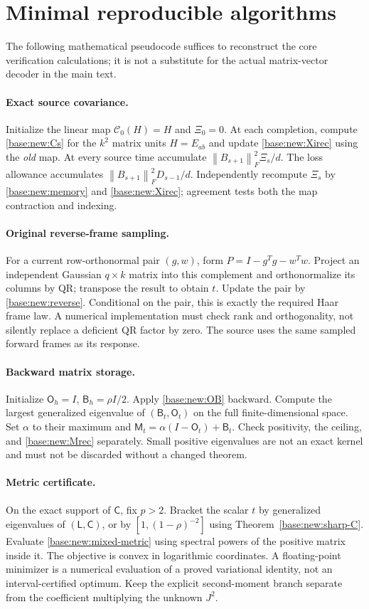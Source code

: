 \documentclass[11pt,oneside,openany,a4paper]{book}
\numberwithin{equation}{chapter}
\theoremstyle{definition}
\theoremstyle{remark}
\newcommand{\F}[1]{\left\lVert#1\right\rVert_F}
\newcommand{\Cov}{\mathsf C}\newcommand{\Loss}{\mathsf L}\newcommand{\Fil}{\mathcal F}
\begin{document}
\section{Minimal reproducible algorithms}\label{base:new:algorithms}
The following mathematical pseudocode suffices to reconstruct the core verification calculations; it is not a substitute for the actual matrix-vector decoder in the main text.

\paragraph{Exact source covariance.}
Initialize the linear map $\mathcal C_0(H)=H$ and $\Xi_0=0$. At each completion, compute \eqref{base:new:Cs} for the $k^2$ matrix units $H=E_{ab}$ and update \eqref{base:new:Xirec} using the \emph{old} map. At every source time accumulate $\F{B_{s+1}}^2\Xi_s/d$. The loss allowance accumulates $\F{B_{s+1}}^2D_{s-1}/d$. Independently recompute $\Xi_s$ by \eqref{base:new:memory} and \eqref{base:new:Xirec}; agreement tests both the map contraction and indexing.

\paragraph{Original reverse-frame sampling.}
For a current row-orthonormal pair $(g,w)$, form $P=I-g^Tg-w^Tw$. Project an independent Gaussian $q\times k$ matrix into this complement and orthonormalize its columns by QR; transpose the result to obtain $t$. Update the pair by \eqref{base:new:reverse}. Conditional on the pair, this is exactly the required Haar frame law. A numerical implementation must check rank and orthogonality, not silently replace a deficient QR factor by zero. The source uses the same sampled forward frames as its response.

\paragraph{Backward matrix storage.}
Initialize $\mathsf O_h=I$, $\mathsf B_h=\rho I/2$. Apply \eqref{base:new:OB} backward. Compute the largest generalized eigenvalue of $(\mathsf B_t,\mathsf O_t)$ on the full finite-dimensional space. Set $\alpha$ to their maximum and $\mathsf M_t=\alpha(I-\mathsf O_t)+\mathsf B_t$. Check positivity, the ceiling, and \eqref{base:new:Mrec} separately. Small positive eigenvalues are not an exact kernel and must not be discarded without a changed theorem.

\paragraph{Metric certificate.}
On the exact support of $\Cov$, fix $p>2$. Bracket the scalar $t$ by generalized eigenvalues of $(\Loss,\Cov)$, or by $[1,(1-\rho)^{-2}]$ using Theorem~\ref{base:new:sharp-C}. Evaluate \eqref{base:new:mixed-metric} using spectral powers of the positive matrix inside it. The objective is convex in logarithmic coordinates. A floating-point minimizer is a numerical evaluation of a proved variational identity, not an interval-certified optimum. Keep the explicit second-moment branch separate from the coefficient multiplying the unknown $J^2$.
\end{document}
